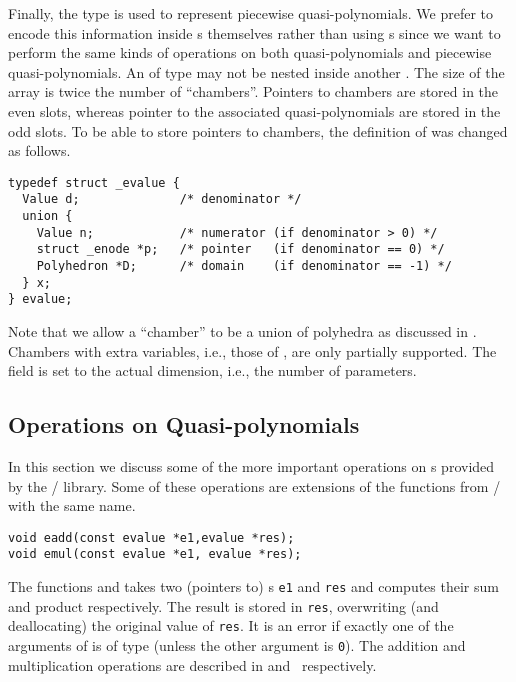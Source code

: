 Finally, the  type is used to
represent piecewise quasi-polynomials.
We prefer to encode this information inside s
themselves
rather than using s since we want
to perform the same kinds of operations on both quasi-polynomials
and piecewise quasi-polynomials.
An  of type  may not be nested
inside another .
The size of the array is twice the number of ``chambers''.
Pointers to chambers are stored in the even slots,
whereas pointer to the associated quasi-polynomials
are stored in the odd slots.
To be able to store pointers to chambers, the
definition of  was changed as follows.
\begin{verbatim}
typedef struct _evalue {
  Value d;              /* denominator */
  union {
    Value n;            /* numerator (if denominator > 0) */
    struct _enode *p;   /* pointer   (if denominator == 0) */
    Polyhedron *D;      /* domain    (if denominator == -1) */
  } x;
} evalue;
\end{verbatim}
Note that we allow a ``chamber'' to be a union of polyhedra
as discussed in .
Chambers with extra variables, i.e., those of
,
are only partially supported.
The field  is set to the actual dimension,
i.e., the number of parameters.

\subsection{Operations on Quasi-polynomials}
\label{a:operations}

In this section we discuss some of the more important
operations on s provided by the
\barvinok/ library.
Some of these operations are extensions
of the functions from \PolyLib/ with the same name.

\begin{verbatim}
void eadd(const evalue *e1,evalue *res);
void emul(const evalue *e1, evalue *res);
\end{verbatim}
The functions  and  takes
two (pointers to) s \verb+e1+ and \verb+res+
and computes their sum and product respectively.
The result is stored in \verb+res+, overwriting (and deallocating)
the original value of \verb+res+.
It is an error if exactly one of
the arguments of  is of type 
(unless the other argument is \verb+0+).
The addition and multiplication operations are described
in  
and~
respectively.

